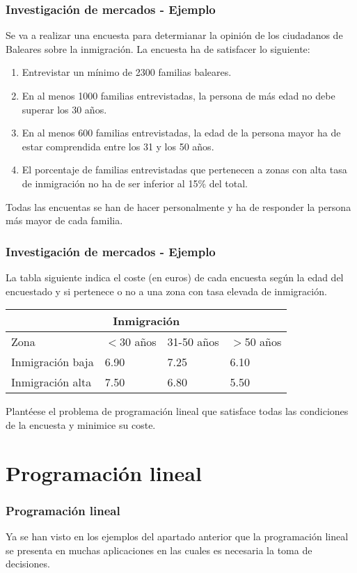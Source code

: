 \documentclass{beamer}
\begin{document}
\begin{frame}
\frametitle{Investigaci\'on de mercados - Ejemplo}
Se va a realizar una encuesta para determianar la opini\'on de los ciudadanos de Baleares sobre la inmigraci\'on. La encuesta ha de satisfacer lo siguiente:
\begin{enumerate}
\item Entrevistar un m\'inimo de 2300 familias baleares.
\item En al menos 1000 familias entrevistadas, la persona de m\'as edad no debe superar los 30 a\~nos.
\item En al menos 600 familias entrevistadas, la edad de la persona mayor ha de estar comprendida entre los 31 y los 50 a\~nos.
\item El porcentaje de familias entrevistadas que pertenecen a zonas con alta tasa de inmigraci\'on no ha de ser inferior al 15\% del total.
\end{enumerate}
Todas las encuentas se han de hacer personalmente y ha de responder la persona m\'as mayor de cada familia.
\end{frame}




\begin{frame}
\frametitle{Investigaci\'on de mercados - Ejemplo}
La tabla siguiente indica el coste (en euros) de cada encuesta seg\'un la edad del encuestado y si pertenece o no a una zona con tasa elevada de inmigraci\'on.

\begin{tabular}{ |p{3cm}||p{2cm}|p{2cm}|p{1.7cm}|  }
 \hline
 \multicolumn{4}{|c|}{Inmigraci\'on} \\
 \hline
 Zona& $<$30  a\~nos &31-50  a\~nos & $>$50 a\~nos\\
 \hline
 Inmigraci\'on baja   & 6.90   &7.25&6.10\\
 Inmigraci\'on alta & 7.50 &6.80&5.50\\
    \hline
\end{tabular}
Plant\'eese el problema de programaci\'on lineal que satisface todas las condiciones de la encuesta y minimice su coste.
\end{frame}

\section{Programaci\'on lineal}

\begin{frame}
\frametitle{Programaci\'on lineal}
Ya se han visto en los ejemplos del apartado anterior que la programaci\'on lineal se presenta en muchas aplicaciones en las cuales es necesaria la toma de decisiones.
\end{frame}
\end{document}
